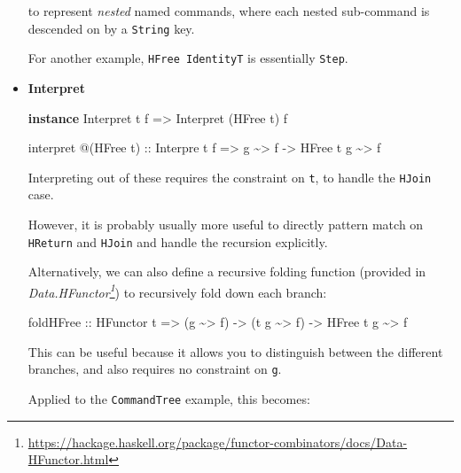 \documentclass[]{article}
\newenvironment{Shaded}{}{}
\newcommand{\DataTypeTok}[1]{\textcolor[rgb]{0.56,0.13,0.00}{#1}}
\newcommand{\KeywordTok}[1]{\textcolor[rgb]{0.00,0.44,0.13}{\textbf{#1}}}
\newcommand{\NormalTok}[1]{#1}
\newcommand{\OperatorTok}[1]{\textcolor[rgb]{0.40,0.40,0.40}{#1}}
\newcommand{\OtherTok}[1]{\textcolor[rgb]{0.00,0.44,0.13}{#1}}
\renewcommand{\href}[2]{#2\footnote{\url{#1}}}
\begin{document}
\begin{itemize}
  to represent \emph{nested} named commands, where each nested sub-command is
  descended on by a \texttt{String} key.

  For another example, \texttt{HFree\ IdentityT} is essentially \texttt{Step}.
\item
  \textbf{Interpret}

\begin{Shaded}
\begin{Highlighting}[]
\KeywordTok{instance} \DataTypeTok{Interpret}\NormalTok{ t f }\OtherTok{=>} \DataTypeTok{Interpret}\NormalTok{ (}\DataTypeTok{HFree}\NormalTok{ t) f}

\NormalTok{interpret }\OperatorTok{@}\NormalTok{(}\DataTypeTok{HFree}\NormalTok{ t)}
\OtherTok{    ::} \DataTypeTok{Interpre}\NormalTok{ t f}
    \OtherTok{=>}\NormalTok{ g }\OperatorTok{\textasciitilde{}>}\NormalTok{ f}
    \OtherTok{{-}>} \DataTypeTok{HFree}\NormalTok{ t g }\OperatorTok{\textasciitilde{}>}\NormalTok{ f}
\end{Highlighting}
\end{Shaded}

  Interpreting out of these requires the constraint on \texttt{t}, to handle the
  \texttt{HJoin} case.

  However, it is probably usually more useful to directly pattern match on
  \texttt{HReturn} and \texttt{HJoin} and handle the recursion explicitly.

  Alternatively, we can also define a recursive folding function (provided in
  \emph{\href{https://hackage.haskell.org/package/functor-combinators/docs/Data-HFunctor.html}{Data.HFunctor}})
  to recursively fold down each branch:

\begin{Shaded}
\begin{Highlighting}[]
\NormalTok{foldHFree}
\OtherTok{    ::} \DataTypeTok{HFunctor}\NormalTok{ t}
    \OtherTok{=>}\NormalTok{ (g }\OperatorTok{\textasciitilde{}>}\NormalTok{ f)}
    \OtherTok{{-}>}\NormalTok{ (t g }\OperatorTok{\textasciitilde{}>}\NormalTok{ f)}
    \OtherTok{{-}>} \DataTypeTok{HFree}\NormalTok{ t g }\OperatorTok{\textasciitilde{}>}\NormalTok{ f}
\end{Highlighting}
\end{Shaded}

  This can be useful because it allows you to distinguish between the different
  branches, and also requires no constraint on \texttt{g}.

  Applied to the \texttt{CommandTree} example, this becomes:


\end{itemize}
\end{document}
